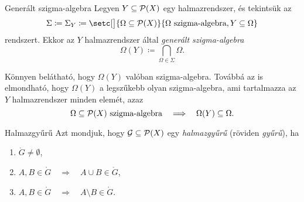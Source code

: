\documentclass[
]{elteikthesis}[2024/04/26]
\begin{document}
	\begin{definition}{Generált szigma-algebra}{}
		Legyen \( Y \subseteq \mathcal{P}( X ) \) egy halmazrendszer, és tekintsük az
		\[
			\Sigma \coloneq \Sigma_Y \coloneq 
			\setc[\big]{ \Omega \subseteq \powerset{X} }
					   { \Omega \text{ szigma-algebra}, Y \subseteq \Omega }
		\]
		rendszert. Ekkor az \( Y \) halmazrendszer által \emph{generált szigma-algebra}
		\[
			\Omega(Y) \coloneq \bigcap_{\Omega \in \Sigma} \Omega.
		\]
	\end{definition}
	
	Könnyen belátható, hogy \( \Omega(Y) \) valóban szigma-algebra. 
	Továbbá az is elmondható, hogy \( \Omega(Y) \) a legszűkebb olyan szigma-algebra, ami tartalmazza az \( Y \) halmazrendszer minden elemét, azaz
	\[
		\Omega \subseteq \mathcal{P}( X ) \text{ szigma-algebra}
		\quad \Longrightarrow \quad
		\Omega(Y) \subseteq \Omega.
	\]
	
	\begin{definition}{Halmazgyűrű}{}
		Azt mondjuk, hogy \( \mathcal{G} \subseteq \mathcal{P}( X ) \) egy \emph{halmazgyűrű} (röviden \emph{gyűrű}), ha
		\begin{enumerate}[label=\( \ring{G} \)\arabic*.]
			\item\label{ax:halmazgyűrű-01}
			\( \ring{G} \neq \emptyset \),
			
			\item\label{ax:halmazgyűrű-02}
			\( A, B \in \ring{G} \quad \Longrightarrow \quad A \cup B \in \ring{G} \),
			
			\item\label{ax:halmazgyűrű-03}
			\( A, B \in \ring{G} \quad \Longrightarrow \quad A \setminus B \in \ring{G} \).
		\end{enumerate}
	\end{definition}
	
\end{document}
